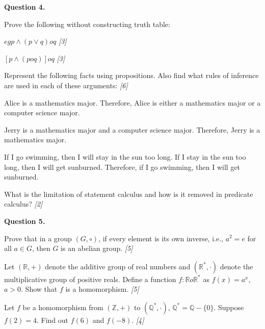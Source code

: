 \documentclass[11pt,a4paper]{article}
\newcommand{\pts}[1]{\hfill   \textit{[#1]}}
\begin{document}
\medskip


\noindent   \textbf{Question 4.}

\begin{parts}
  \item Prove the following without constructing truth table:
  
\begin{parts}
    \item $
eg p \land (p \lor q)  o q$ \pts{3}
    \item $[p \land (p  o q)]  o q$ \pts{3}
  \end{parts}
  \item Represent the following facts using propositions. Also find what rules of inference are used in each of these arguments: \pts{6}
  
\begin{parts}
    \item Alice is a mathematics major. Therefore, Alice is either a mathematics major or a computer science major.
    \item Jerry is a mathematics major and a computer science major. Therefore, Jerry is a mathematics major.
    \item If I go swimming, then I will stay in the sun too long. If I stay in the sun too long, then I will get sunburned. Therefore, if I go swimming, then I will get sunburned.
  \end{parts}
  \item What is the limitation of statement calculus and how is it removed in predicate calculus? \pts{2}
\end{parts}

\medskip


\noindent   \textbf{Question 5.}

\begin{parts}
  \item 
  
\begin{parts}
    \item Prove that in a group $(G, \circ)$, if every element is its own inverse, i.e., $a^2 = e$ for all $a \in G$, then $G$ is an abelian group. \pts{5}
    \item Let $(\mathbb{R}, +)$ denote the additive group of real numbers and $(\mathbb{R}^*, \cdot)$ denote the multiplicative group of positive reals. Define a function $f: \mathbb{R}  o \mathbb{R}^*$ as $f(x) = a^x$, $a > 0$. Show that $f$ is a homomorphism. \pts{5}
  \end{parts}
  \item Let $f$ be a homomorphism from $(\mathbb{Z}, +)$ to $(\mathbb{Q}^* , \cdot)$, $\mathbb{Q}^* = \mathbb{Q} - \{0\}$. Suppose $f(2) = 4$. Find out $f(6)$ and $f(-8)$. \pts{4}
\end{parts}
\end{document}
